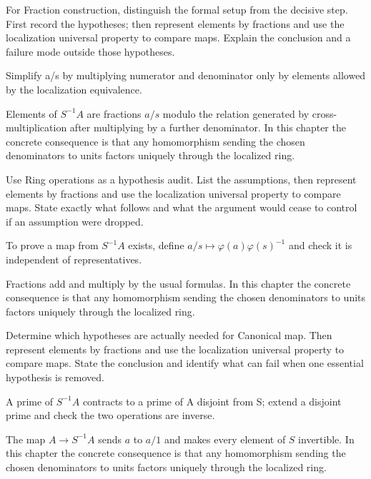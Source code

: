 \begin{exercise}\label{exr:v06-01}
For Fraction construction, distinguish the formal setup from the decisive step. First record the hypotheses; then represent elements by fractions and use the localization universal property to compare maps. Explain the conclusion and a failure mode outside those hypotheses.
\end{exercise}
\begin{hint}
Simplify a/s by multiplying numerator and denominator only by elements allowed by the localization equivalence.
\end{hint}
\begin{solution}
Elements of $S^{-1}A$ are fractions $a/s$ modulo the relation generated by cross-multiplication after multiplying by a further denominator. In this chapter the concrete consequence is that any homomorphism sending the chosen denominators to units factors uniquely through the localized ring.
\end{solution}

\begin{exercise}\label{exr:v06-02}
Use Ring operations as a hypothesis audit. List the assumptions, then represent elements by fractions and use the localization universal property to compare maps. State exactly what follows and what the argument would cease to control if an assumption were dropped.
\end{exercise}
\begin{hint}
To prove a map from \(S^{-1}A\) exists, define \(a/s\mapsto \varphi(a)\varphi(s)^{-1}\) and check it is independent of representatives.
\end{hint}
\begin{solution}
Fractions add and multiply by the usual formulas. In this chapter the concrete consequence is that any homomorphism sending the chosen denominators to units factors uniquely through the localized ring.
\end{solution}

\begin{exercise}\label{exr:v06-03}
Determine which hypotheses are actually needed for Canonical map. Then represent elements by fractions and use the localization universal property to compare maps. State the conclusion and identify what can fail when one essential hypothesis is removed.
\end{exercise}
\begin{hint}
A prime of \(S^{-1}A\) contracts to a prime of A disjoint from S; extend a disjoint prime and check the two operations are inverse.
\end{hint}
\begin{solution}
The map $A\to S^{-1}A$ sends $a$ to $a/1$ and makes every element of $S$ invertible. In this chapter the concrete consequence is that any homomorphism sending the chosen denominators to units factors uniquely through the localized ring.
\end{solution}


